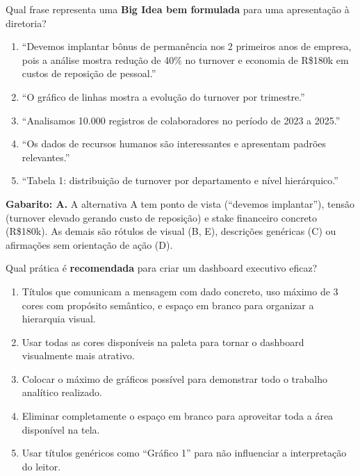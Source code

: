 \begin{SolvedBox}[title=Questão 8 (Prova Final) --- Big Idea (1{,}0 pt)]
Qual frase representa uma \textbf{Big Idea bem formulada} para uma apresentação à diretoria?
\begin{enumerate}[label=\Alph*)]
  \item ``Devemos implantar bônus de permanência nos 2 primeiros anos de empresa, pois a análise mostra redução de 40\% no turnover e economia de R\$180k em custos de reposição de pessoal.''
  \item ``O gráfico de linhas mostra a evolução do turnover por trimestre.''
  \item ``Analisamos 10.000 registros de colaboradores no período de 2023 a 2025.''
  \item ``Os dados de recursos humanos são interessantes e apresentam padrões relevantes.''
  \item ``Tabela 1: distribuição de turnover por departamento e nível hierárquico.''
\end{enumerate}
\end{SolvedBox}

\textbf{Gabarito: A.} A alternativa A tem ponto de vista (``devemos implantar''), tensão (turnover elevado gerando custo de reposição) e stake financeiro concreto (R\$180k). As demais são rótulos de visual (B, E), descrições genéricas (C) ou afirmações sem orientação de ação (D).

\begin{SolvedBox}[title=Questão 9 (Prova Final) --- Design de Dashboard (1{,}0 pt)]
Qual prática é \textbf{recomendada} para criar um dashboard executivo eficaz?
\begin{enumerate}[label=\Alph*)]
  \item Títulos que comunicam a mensagem com dado concreto, uso máximo de 3 cores com propósito semântico, e espaço em branco para organizar a hierarquia visual.
  \item Usar todas as cores disponíveis na paleta para tornar o dashboard visualmente mais atrativo.
  \item Colocar o máximo de gráficos possível para demonstrar todo o trabalho analítico realizado.
  \item Eliminar completamente o espaço em branco para aproveitar toda a área disponível na tela.
  \item Usar títulos genéricos como ``Gráfico 1'' para não influenciar a interpretação do leitor.
\end{enumerate}
\end{SolvedBox}

